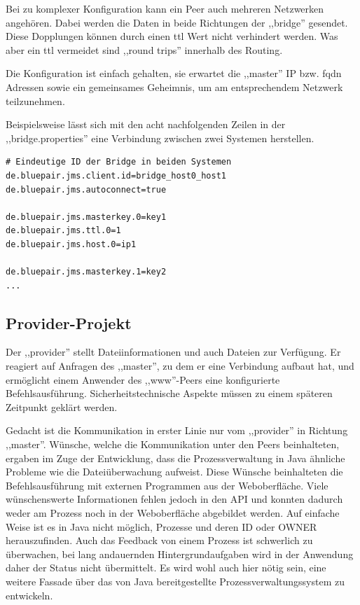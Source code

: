 \documentclass[oneside, ngerman, toc=bibliography,bibliography=totoc,listof=entryprefix, open=right,numbers=noenddot,fontsize=12pt]{scrbook}
\begin{document}
Bei zu komplexer Konfiguration kann ein Peer auch mehreren Netzwerken angehören.
Dabei werden die Daten in beide Richtungen der ,,bridge'' gesendet. Diese Dopplungen können durch einen \acrfull{ttl} Wert nicht verhindert werden. Was aber ein \acrshort{ttl} vermeidet sind ,,round trips'' innerhalb des Routing.

Die Konfiguration ist einfach gehalten, sie erwartet die ,,master'' IP bzw. \acrfull{fqdn} Adressen sowie ein gemeinsames Geheimnis, um am entsprechendem Netzwerk teilzunehmen.

\bigskip
Beispielsweise lässt sich mit den acht nachfolgenden Zeilen in der ,,bridge.properties'' eine Verbindung zwischen zwei Systemen herstellen.

\begin{verbatim}
# Eindeutige ID der Bridge in beiden Systemen
de.bluepair.jms.client.id=bridge_host0_host1
de.bluepair.jms.autoconnect=true

de.bluepair.jms.masterkey.0=key1
de.bluepair.jms.ttl.0=1
de.bluepair.jms.host.0=ip1

de.bluepair.jms.masterkey.1=key2
...
\end{verbatim}


\subsection{Provider-Projekt}
Der ,,provider'' stellt Dateiinformationen und auch Dateien zur Verfügung. Er reagiert auf Anfragen des ,,master'', zu dem er eine Verbindung aufbaut hat, und ermöglicht einem Anwender des ,,www''-Peers eine konfigurierte Befehlsausführung. Sicherheitstechnische Aspekte müssen zu einem späteren Zeitpunkt geklärt werden. 

Gedacht ist die Kommunikation in erster Linie nur vom ,,provider'' in Richtung ,,master''. 
Wünsche, welche die Kommunikation unter den Peers beinhalteten, ergaben im Zuge der Entwicklung, dass die Prozessverwaltung in Java ähnliche Probleme wie die Dateiüberwachung aufweist. Diese Wünsche beinhalteten die Befehlsausführung mit externen Programmen aus der Weboberfläche. Viele wünschenswerte Informationen fehlen jedoch in den API und konnten dadurch weder am Prozess noch in der Weboberfläche abgebildet werden. Auf einfache Weise ist es in Java nicht möglich, Prozesse und deren ID oder OWNER herauszufinden.
Auch das Feedback von einem Prozess ist schwerlich zu überwachen, bei lang andauernden Hintergrundaufgaben wird in der Anwendung daher der Status nicht übermittelt. Es wird wohl auch hier nötig sein, eine weitere Fassade über das von Java bereitgestellte Prozessverwaltungssystem zu entwickeln.
\end{document}
